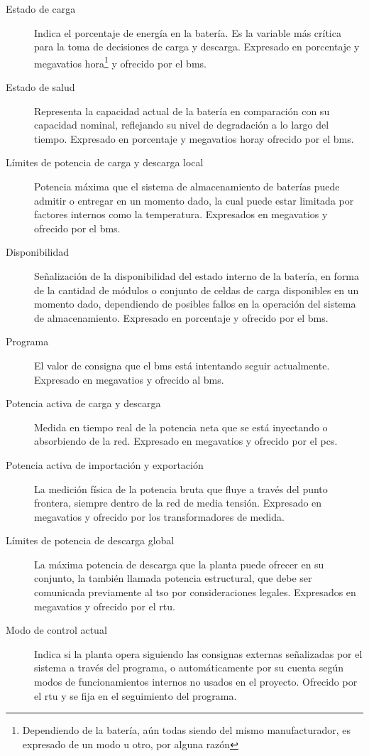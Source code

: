 \begin{description}

  \item[Estado de carga] Indica el porcentaje de energía en la batería. Es la variable más crítica para la toma de decisiones de carga y descarga. Expresado en porcentaje y megavatios hora\footnote{Dependiendo de la batería, aún todas siendo del mismo manufacturador, es expresado de un modo u otro, por alguna razón} y ofrecido por el \gls{bms}.

  \item[Estado de salud] Representa la capacidad actual de la batería en comparación con su capacidad nominal, reflejando su nivel de degradación a lo largo del tiempo. Expresado en porcentaje y megavatios hora\footnotemark[\value{footnote}] y ofrecido por el \gls{bms}.

  \item[Límites de potencia de carga y descarga local] Potencia máxima que el sistema de almacenamiento de baterías puede admitir o entregar en un momento dado, la cual puede estar limitada por factores internos como la temperatura. Expresados en megavatios y ofrecido por el \gls{bms}.

  \item[Disponibilidad] Señalización de la disponibilidad del estado interno de la batería, en forma de la cantidad de módulos o conjunto de celdas de carga disponibles en un momento dado, dependiendo de posibles fallos en la operación del sistema de almacenamiento. Expresado en porcentaje y ofrecido por el \gls{bms}.

  \item[Programa] El valor de consigna que el \gls{bms} está intentando seguir actualmente. Expresado en megavatios y ofrecido al \gls{bms}.

  \item[Potencia activa de carga y descarga] Medida en tiempo real de la potencia neta que se está inyectando o absorbiendo de la red. Expresado en megavatios y ofrecido por el \gls{pcs}.

  \item[Potencia activa de importación y exportación] La medición física de la potencia bruta que fluye a través del punto frontera, siempre dentro de la red de media tensión. Expresado en megavatios y ofrecido por los transformadores de medida.

  \item[Límites de potencia de descarga global] La máxima potencia de descarga que la planta puede ofrecer en su conjunto, la también llamada potencia estructural, que debe ser comunicada previamente al \gls{tso} por consideraciones legales. Expresados en megavatios y ofrecido por el \gls{rtu}.

  \item[Modo de control actual] Indica si la planta opera siguiendo las consignas externas señalizadas por el sistema a través del programa, o automáticamente por su cuenta según modos de funcionamientos internos no usados en el proyecto. Ofrecido por el \gls{rtu} y se fija en el seguimiento del programa.

\end{description}

